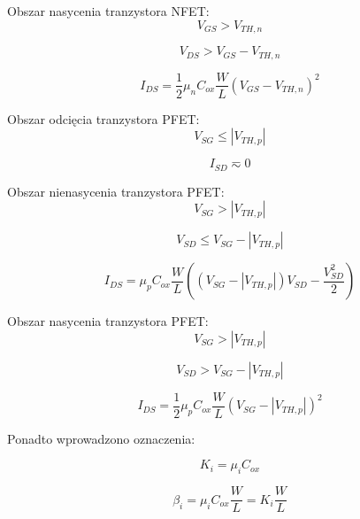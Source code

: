 \documentclass[10pt,a4paper]{report}
\begin{document}
	{	Obszar nasycenia tranzystora NFET:
		\begin{equation}
			V_{GS} > V_{TH,n}
		\end{equation}
		
		\begin{equation}
			V_{DS} > V_{GS} - V_{TH,n}
		\end{equation}
		
		\begin{equation}
			I_{DS} = \frac{1}{2} \mu_n C_{ox} \frac{W}{L} \left( V_{GS} - V_{TH,n} \right)^2
		\end{equation}	
	}

	{	Obszar odcięcia tranzystora PFET:
		\begin{equation}
		V_{SG} \leq \left|V_{TH,p}\right|
		\end{equation}
		
		\begin{equation}
		I_{SD} \eqsim 0
		\end{equation}
	}
	
	{	Obszar nienasycenia tranzystora PFET:
		\begin{equation}
		V_{SG} > \left|V_{TH,p}\right|
		\end{equation}
		
		\begin{equation}
		V_{SD} \leq V_{SG} - \left|V_{TH,p}\right|
		\end{equation}
		
		\begin{equation}
		I_{DS} = \mu_p C_{ox} \frac{W}{L} \left( \left(V_{SG} - \left|V_{TH,p}\right| \right) V_{SD} - \frac{V_{SD}^2}{2}  \right)
		\end{equation}
	}
	
	{	Obszar nasycenia tranzystora PFET:
		\begin{equation}
		V_{SG} > \left|V_{TH,p}\right|
		\end{equation}
		
		\begin{equation}
		V_{SD} > V_{SG} - \left|V_{TH,p}\right|
		\end{equation}
		
		\begin{equation}
		I_{DS} = \frac{1}{2} \mu_p C_{ox} \frac{W}{L} \left( V_{SG} - \left|V_{TH,p}\right| \right)^2
		\end{equation}	
	}

	{	Ponadto wprowadzono oznaczenia:
	
		$$
			K_i = \mu_i C_{ox}
		$$
	
		$$
			\beta_i = \mu_i C_{ox} \frac{W}{L} = K_i \frac{W}{L}
		$$
	}
\end{document}
